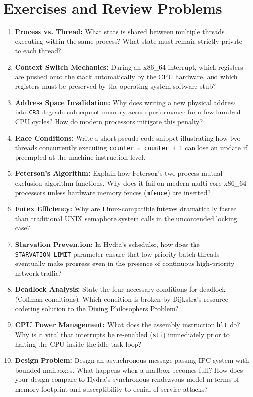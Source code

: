 \section{Exercises and Review Problems}
\label{sec:exercises_chap2}

\begin{enumerate}
    \item \textbf{Process vs. Thread:} What state is shared between multiple threads executing within the same process? What state must remain strictly private to each thread?
    \item \textbf{Context Switch Mechanics:} During an x86\_64 interrupt, which registers are pushed onto the stack automatically by the CPU hardware, and which registers must be preserved by the operating system software stub?
    \item \textbf{Address Space Invalidation:} Why does writing a new physical address into \texttt{CR3} degrade subsequent memory access performance for a few hundred CPU cycles? How do modern processors mitigate this penalty?
    \item \textbf{Race Conditions:} Write a short pseudo-code snippet illustrating how two threads concurrently executing \texttt{counter = counter + 1} can lose an update if preempted at the machine instruction level.
    \item \textbf{Peterson's Algorithm:} Explain how Peterson's two-process mutual exclusion algorithm functions. Why does it fail on modern multi-core x86\_64 processors unless hardware memory fences (\texttt{mfence}) are inserted?
    \item \textbf{Futex Efficiency:} Why are Linux-compatible futexes dramatically faster than traditional UNIX semaphore system calls in the uncontended locking case?
    \item \textbf{Starvation Prevention:} In Hydra's scheduler, how does the \texttt{STARVATION\_LIMIT} parameter ensure that low-priority batch threads eventually make progress even in the presence of continuous high-priority network traffic?
    \item \textbf{Deadlock Analysis:} State the four necessary conditions for deadlock (Coffman conditions). Which condition is broken by Dijkstra's resource ordering solution to the Dining Philosophers Problem?
    \item \textbf{CPU Power Management:} What does the assembly instruction \texttt{hlt} do? Why is it vital that interrupts be re-enabled (\texttt{sti}) immediately prior to halting the CPU inside the idle task loop?
    \item \textbf{Design Problem:} Design an asynchronous message-passing IPC system with bounded mailboxes. What happens when a mailbox becomes full? How does your design compare to Hydra's synchronous rendezvous model in terms of memory footprint and susceptibility to denial-of-service attacks?
\end{enumerate}

